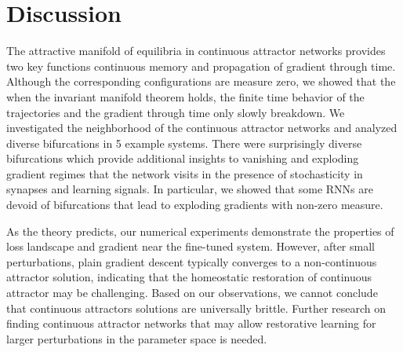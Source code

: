 \documentclass{article} %
\newcounter{ct}
\theoremstyle{definition}
\theoremstyle{remark}
\begin{document}
\section{Discussion}
The attractive manifold of equilibria in continuous attractor networks provides two key functions continuous memory and propagation of gradient through time.
Although the corresponding configurations are measure zero, we showed that the when the invariant manifold theorem holds, the finite time behavior of the trajectories and the gradient through time only slowly breakdown.
We investigated the neighborhood of the continuous attractor networks and analyzed diverse bifurcations in 5 example systems.
There were surprisingly diverse bifurcations which provide additional insights to vanishing and exploding gradient regimes that the network visits in the presence of stochasticity in synapses and learning signals.
In particular, we showed that some RNNs are devoid of bifurcations that lead to exploding gradients with non-zero measure.

As the theory predicts, our numerical experiments demonstrate the properties of loss landscape and gradient near the fine-tuned system.
However, after small perturbations, plain gradient descent typically converges to a non-continuous attractor solution, indicating that the homeostatic restoration of continuous attractor may be challenging.
Based on our observations, we cannot conclude that continuous attractors solutions are universally brittle.
Further research on finding continuous attractor networks that may allow restorative learning for larger perturbations in the parameter space is needed.


%
%
\end{document}
